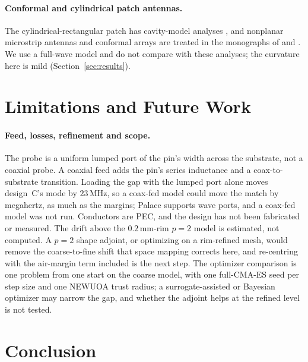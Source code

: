 \documentclass{anvil-paper}
\begin{document}
\paragraph{Conformal and cylindrical patch antennas.}
The cylindrical-rectangular patch has cavity-model analyses
\citep{krowne1983cylindrical,luk1989cylindrical}, and nonplanar microstrip
antennas and conformal arrays are treated in the monographs of
\citet{wong1999nonplanar} and \citet{josefsson2006conformal}. We use a
full-wave model and do not compare with these analyses; the curvature here
is mild (Section~\ref{sec:results}).

\section{Limitations and Future Work}
\label{sec:limits}

\paragraph{Feed, losses, refinement and scope.}
The probe is a uniform lumped port of the pin's width across the substrate,
not a coaxial probe. A coaxial feed adds the pin's series inductance and a
coax-to-substrate transition. Loading the gap with the lumped port alone
moves design~C's mode by $23$\,MHz, so a coax-fed model could move the
match by megahertz, as much as the margins; Palace supports wave ports, and
a coax-fed model was not run. Conductors are PEC, and the design has not
been fabricated or measured.
The drift above the $0.2$\,mm-rim $p = 2$ model is estimated, not computed.
A $p = 2$ shape adjoint, or optimizing on a rim-refined mesh, would remove
the coarse-to-fine shift that space mapping corrects here, and re-centring
with the air-margin term included is the next step. The optimizer
comparison is one problem from one start on the coarse model, with one
full-CMA-ES seed per step size and one NEWUOA trust radius; a
surrogate-assisted or Bayesian optimizer may narrow the gap, and whether the
adjoint helps at the refined level is not tested.

\section{Conclusion}
\label{sec:conclusion}
\end{document}
